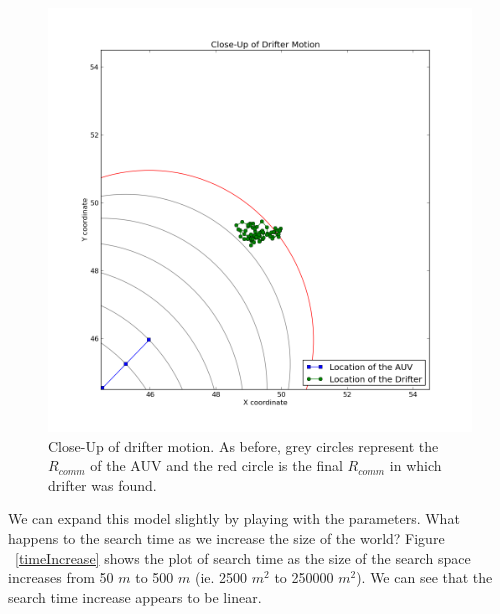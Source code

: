 \documentclass[a4paper, 11pt]{article} %
\begin{document}
\begin{figure}[H]
	\begin{center}
		\includegraphics[scale=0.30]{basic_2.png}
	\end{center}
\caption{Close-Up of drifter motion. As before, grey circles represent the $R_{comm}$ of the AUV and the red circle is the final $R_{comm}$ in which drifter was found. \label{basicDriferCloseup}}
\end{figure}

\noindent We can expand this model slightly by playing with the parameters. What happens to the search time as we increase the size of the world? Figure ~\ref{timeIncrease} shows the plot of search time as the size of the search space increases from 50 $m$ to 500 $m$ (ie. 2500 $m^2$ to 250000 $m^2$). We can see that the search time increase appears to be linear. 
\end{document}
